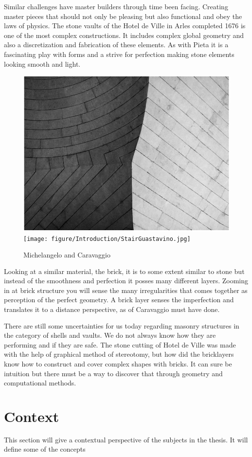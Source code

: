 Similar challenges have master builders through time been facing. Creating master pieces that should not only be pleasing but also functional and obey the laws of physics. The stone vaults of the Hotel de Ville in Arles completed 1676 is one of the most complex constructions. It includes complex global geometry and also a discretization and fabrication of these elements. As with Pieta it is a fascinating play with forms and a strive for perfection making stone elements looking smooth and light.


\begin{figure}[H]
\centering
\includegraphics[height=0.35\linewidth ]{figure/Introduction/Arles4B.jpg}
\texttt{[image: figure/Introduction/StairGuastavino.jpg]}
\caption{Michelangelo and Caravaggio}
\end{figure}

Looking at a similar material, the brick, it is to some extent similar to stone but instead of the smoothness and perfection it posses many different layers. Zooming in at brick structure you will sense the many irregularities that comes together as  perception of the perfect geometry. A brick layer senses the imperfection and translates it to a distance perspective, as of Caravaggio must have done.

\vspace{5mm}

There are still some uncertainties for us today regarding masonry structures in the category of shells and vaults. We do not always know how they are performing and if they are safe. The stone cutting of Hotel de Ville was made with the help of graphical method of stereotomy, but how did the bricklayers know how to construct and cover complex shapes with bricks. It can sure be intuition but there must be a way to discover that through geometry and computational methods.





\section{Context}
This section will give a contextual perspective of the subjects in the thesis. It will define some of the concepts



